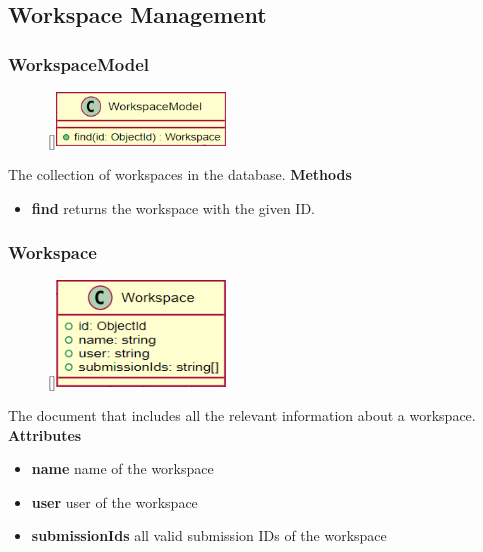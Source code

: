 \subsection{Workspace Management}

\subsubsection{WorkspaceModel}
\begin{figure}
    \raisebox{0pt}[\dimexpr{}\baselineskip\relax]{\includegraphics[width=4.5cm]{classes/workspace-management/1.png}}
\end{figure} 
\par
The collection of workspaces in the database.
\newline
\newline
\textbf{Methods}
\begin{itemize}
    \item \textbf{find} returns the workspace with the given ID.
\end{itemize}

\subsubsection{Workspace}
\begin{figure}
    \raisebox{0pt}[\dimexpr{}\baselineskip\relax]{\includegraphics[width=4.5cm]{classes/workspace-management/2.png}}
\end{figure} 
\par
The document that includes all the relevant information about a workspace.
\newline
\newline
\textbf{Attributes}
\begin{itemize}
    \item \textbf{name} name of the workspace
    \item \textbf{user} user of the workspace
    \item \textbf{submissionIds} all valid submission IDs of the workspace
\end{itemize}

